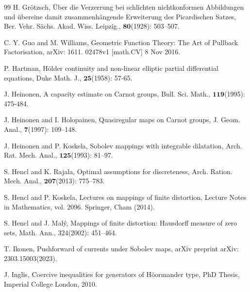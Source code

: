 \documentclass[11pt,twoside]{article}
\theoremstyle{definition}
\theoremstyle{remark}
\begin{document}
\begin{thebibliography}{99}
H. Gr\"{o}tzsch,  \"{U}ber die Verzerrung bei schlichten nichtkonformen Abbildungen und \"{u}bereine damit zusammenh\"{a}ngende Erweiterung des Picardischen Satzes, Ber. Vehr. S\"{a}chs.
Akad. Wiss. Leipzig., $\mathbf{80}$(1928): 503–507.






C. Y. Guo and M.  Williams,  Geometric Function Theory: The Art of Pullback Factorisation, arXiv: 1611. 02478v1  [math.CV]  8 Nov 2016.

P. Hartman, H\"{o}lder continuity and non-linear elliptic partial differential equations, Duke Math. J., $\mathbf{25}$(1958): 57-65.



 J. Heinonen, A capacity estimate on Carnot groups, Bull. Sci. Math., $\mathbf{119}$(1995): 475-484.


J. Heinonen and I. Holopainen, Quasiregular maps on Carnot groups, J. Geom. Anal., $\mathbf{7}$(1997): 109–148.

J. Heinonen and P. Koskela, Sobolev mappings with integrable dilatation, Arch. Rat. Mech. Anal., $\mathbf{125}$(1993): 81–97.

S. Hencl and K. Rajala, Optimal assumptions for discreteness, Arch. Ration. Mech. Anal., $\mathbf{207}$(2013): 775–783.
 



S. Hencl and P.  Koskela, Lectures on mappings of finite distortion, Lecture Notes in Mathematics, vol. 2096. Springer, Cham (2014).





















S. Hencl and J. Mal\'{y}, Mappings of finite distortion: Hausdorff measure of zero sets, Math. Ann., 324(2002): 451–464.




T. Ikonen, Pushforward of currents under Sobolev maps, arXiv preprint arXiv: 2303.15003(2023).


 J. Inglis, Coercive inequalities for generators of H\"{o}ormander type, PhD Thesis, Imperial College London, 2010.


\end{thebibliography}
\end{document}
